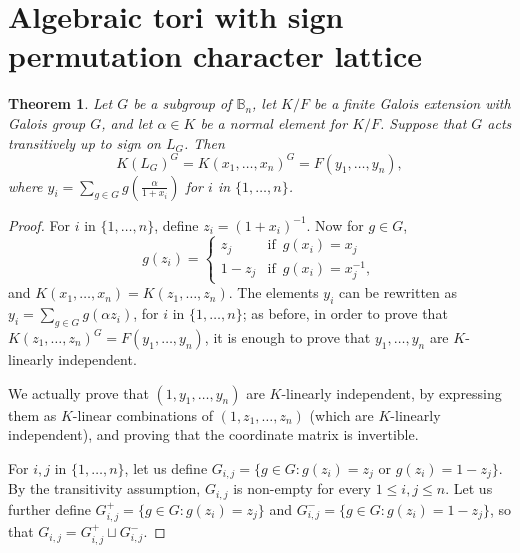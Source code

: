 \documentclass[12pt]{article}
\theoremstyle{plain}
\newtheorem{theorem}{Theorem}
\begin{document}
\section{Algebraic tori with sign permutation character lattice}


\begin{theorem}\label{nonamesign}
  Let $G$ be a subgroup of $\mathbb{B}_n$, let $K/F$ be a finite
  Galois extension with Galois group $G$, and let $\alpha \in K$ be a
  normal element for $K/F$. Suppose that $G$ acts transitively up to
  sign on $L_G$. Then
  $$K(L_G)^G = K(x_1,\ldots, x_n)^G = F(y_1, \ldots, y_{n}),$$ 
  where $y_i = \sum_{g \in G} g\left (\frac{\alpha}{1+x_i}\right)$ for $i$ in $\{1, \ldots, n\}$.
\end{theorem}
\begin{proof}
  For $i$ in $\{1,\dots,n\}$, define $z_i = (1+x_i)^{-1} $. Now for $g
  \in G$, $$g(z_i) = \begin{cases} z_j & \text{if} \,\,\, g(x_i) = x_j
    \\ 1-z_j & \text{if} \,\,\, g(x_i) = x_j^{-1},
  \end{cases}$$ 
  and $K(x_1, \ldots , x_n) = K(z_1, \ldots, z_n).$ The elements $y_i$
  can be rewritten as $y_i = \sum_{g \in G} g ({\alpha}z_i)$, for $i$
  in $\{1, \ldots, n\}$; as before, in order to prove that
  $K(z_1,\ldots, z_n)^G = F(y_1, \ldots, y_{n})$, it is enough to
  prove that $y_1,\dots,y_n$ are $K$-linearly independent.

  We actually prove that $(1,y_1,\dots,y_n)$ are $K$-linearly
  independent, by expressing them as $K$-linear combinations of
  $(1,z_1,\dots,z_n)$ (which are $K$-linearly independent), and
  proving that the coordinate matrix is invertible.

  For $i,j$ in $\lbrace 1, \ldots , n \rbrace$, let us define $G_{i,j} =
  \lbrace g \in G : g(z_i) = z_j \,\, \text{or} \,\, g(z_i) = 1-z_j
  \rbrace $. By the transitivity assumption, $G_{i,j}$ is
  non-empty for every $1 \leq i,j \leq n$. Let us further define $G^{+}_{i,j}
  = \lbrace g \in G : g(z_i) = z_j \rbrace$ and $G^{-}_{i,j} =
  \lbrace g \in G : g(z_i) = 1- z_j \rbrace$, so that $G_{i,j}=
  G^{+}_{i,j}\sqcup G^{-}_{i,j}$.  


\end{proof}
\end{document}
